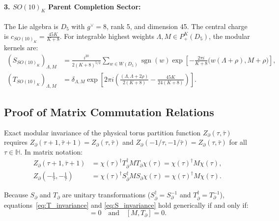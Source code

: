 \documentclass[11pt,letterpaper]{article}
\theoremstyle{plain}
\begin{document}
\paragraph{3. $SO(10)_K$ Parent Completion Sector:} The Lie algebra is $D_5$ with $g^\vee = 8$, rank 5, and dimension 45. The central charge is $c_{SO(10)_K} = \frac{45K}{K + 8}$. For integrable highest weights $\Lambda, M \in P_+^K(D_5)$, the modular kernels are:
\begin{align}
(S_{SO(10)_K})_{\Lambda, M} &= \frac{i^{20}}{2(K + 8)^{5/2}} \sum_{w \in W(D_5)} \operatorname{sgn}(w) \exp\left[ -\frac{2\pi i}{K + 8} \Big( w(\Lambda + \rho), M + \rho \Big) \right], \label{eq:S_so10} \\
(T_{SO(10)_K})_{\Lambda, M} &= \delta_{\Lambda, M} \exp\left[ 2\pi i \left( \frac{(\Lambda, \Lambda + 2\rho)}{2(K + 8)} - \frac{45K}{24(K + 8)} \right) \right]. \label{eq:T_so10}
\end{align}

\subsection{Proof of Matrix Commutation Relations}
Exact modular invariance of the physical torus partition function $Z_{\partial}(\tau, \bar{\tau})$ requires $Z_{\partial}(\tau + 1, \bar{\tau} + 1) = Z_{\partial}(\tau, \bar{\tau})$ and $Z_{\partial}(-1/\tau, -1/\bar{\tau}) = Z_{\partial}(\tau, \bar{\tau})$ for all $\tau \in \mathbb{H}$. In matrix notation:
\begin{align}
Z_{\partial}(\tau + 1, \bar{\tau} + 1) &= \chi(\tau)^\dagger T_{\partial}^\dagger M T_{\partial} \chi(\tau) = \chi(\tau)^\dagger M \chi(\tau), \label{eq:T_invariance} \\
Z_{\partial}\left(-\frac{1}{\tau}, -\frac{1}{\bar{\tau}}\right) &= \chi(\tau)^\dagger S_{\partial}^\dagger M S_{\partial} \chi(\tau) = \chi(\tau)^\dagger M \chi(\tau). \label{eq:S_invariance}
\end{align}

Because $S_{\partial}$ and $T_{\partial}$ are unitary transformations ($S_{\partial}^\dagger = S_{\partial}^{-1}$ and $T_{\partial}^\dagger = T_{\partial}^{-1}$), equations~\eqref{eq:T_invariance} and \eqref{eq:S_invariance} hold generically if and only if:
\begin{equation}
[M, S_{\partial}] = 0 \quad \text{and} \quad [M, T_{\partial}] = 0.
\end{equation}
\end{document}
